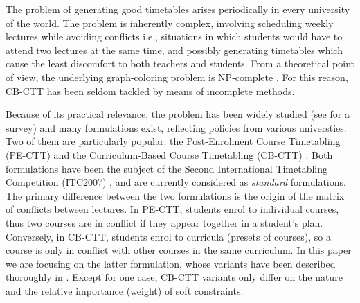 \documentclass{llncs}
\newcommand{\ignore}[1]{}
\begin{document}
The problem of generating good timetables arises periodically in every university of the world. The problem is inherently complex, involving scheduling weekly lectures while avoiding conflicts i.e., situations in which students would have to attend two lectures at the same time, and possibly generating timetables which cause the least discomfort to both teachers and students.
From a theoretical point of view, the underlying graph-coloring problem is NP-complete \cite{Werr85}. For this reason, CB-CTT has been seldom tackled by means of incomplete methods.

Because of its practical relevance, the problem has been widely studied (see \cite{Scha99} for a survey) and many formulations exist, reflecting policies from various universties. Two of them are particularly popular: the Post-Enrolment Course Timetabling (PE-CTT) \ignore{\cite{LePM07}} and the Curriculum-Based Course Timetabling (CB-CTT) \cite{DiMS07}. Both formulations have been the subject of the Second International Timetabling Competition (ITC2007) \cite{DiMS07}, and are currently considered as \emph{standard} formulations. 
%
The primary difference between the two formulations is the origin of the matrix of conflicts between lectures. In PE-CTT, students enrol to individual courses, thus two courses are in conflict if they appear together in a student's plan. Conversely, in CB-CTT, students enrol to curricula (presets of courses), so a course is only in conflict with other courses in the same curriculum. In this paper we are focusing on the latter formulation, whose variants have been described thoroughly in \cite{BDDS12}.
Except for one case, CB-CTT variants only differ on the nature and the relative importance (weight) of soft constraints.

\end{document}
